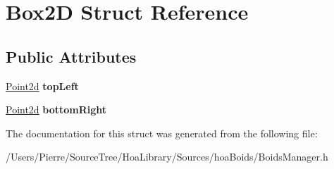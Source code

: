 \hypertarget{struct_box2_d}{\section{Box2\-D Struct Reference}
\label{struct_box2_d}
}
\subsection*{Public Attributes}
\begin{DoxyCompactItemize}
\item 
\hypertarget{struct_box2_d_a59da5e38c51aab91e831319f410c979c}{\hyperlink{struct_point2d}{Point2d} {\bfseries top\-Left}}\label{struct_box2_d_a59da5e38c51aab91e831319f410c979c}

\item 
\hypertarget{struct_box2_d_aff89c6fd8692299c3501c8aae7322725}{\hyperlink{struct_point2d}{Point2d} {\bfseries bottom\-Right}}\label{struct_box2_d_aff89c6fd8692299c3501c8aae7322725}

\end{DoxyCompactItemize}


The documentation for this struct was generated from the following file\-:\begin{DoxyCompactItemize}
\item 
/\-Users/\-Pierre/\-Source\-Tree/\-Hoa\-Library/\-Sources/hoa\-Boids/Boids\-Manager.\-h\end{DoxyCompactItemize}
